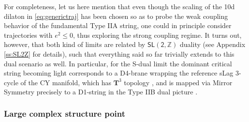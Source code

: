 For completeness, let us here mention that even though the scaling of the 10d dilaton in \eqref{eq:generictraj} has been chosen so as to probe the weak coupling behavior of the fundamental Type IIA string, one could in principle consider trajectories with $e^2 \leq 0$, thus exploring the strong coupling regime. It turns out, however, that both kind of limits are related by $\mathsf{SL(2, \mathbb{Z})}$ duality (see Appendix \ref{ss:SL2Z} for details), such that everything said so far trivially extends to this dual scenario as well. In particular, for the S-dual limit the dominant critical string becoming light corresponds to a D4-brane wrapping the reference sLag 3-cycle of the CY manifold, which has $\mathbf{T}^3$ topology \cite{Strominger:1996it}, %
and is mapped via Mirror Symmetry precisely to a D1-string in the Type IIB dual picture \cite{Alvarez-Garcia:2021pxo}.
	
\subsubsection*{Large complex structure point}
	

